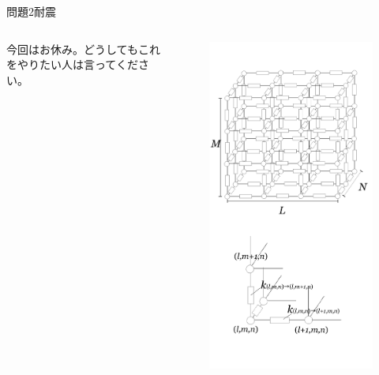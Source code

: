 \documentclass[dvipdfmx]{beamer}
\newenvironment{wideitemize}{\itemize\setlength{\itemsep}{1em}}{\enditemize}
\begin{document}

\begin{frame}{問題2}{耐震}
\begin{columns}[t]
\begin{column}{0.7\textwidth}
\begin{wideitemize}
	\item 今回はお休み。どうしてもこれをやりたい人は言ってください。

\end{wideitemize}

\end{column}
\begin{column}{0.3\textwidth}
\begin{figure}[htbp]
    \centering
    \includegraphics[bb=0mm 0mm 100.0mm 170.0mm, scale=0.35, type=pdf]{img/problem2.pdf}

\end{figure}
\end{column}
\end{columns}
\end{frame}
\end{document}
